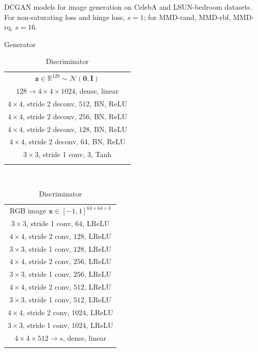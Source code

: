 \documentclass{article} %
\theoremstyle{plain}
\newtheorem*{proposition 1*}{Proposition 1}
\newcommand{\ds}[1]{\mathcal{#1}}  %
\newcommand{\set}[1]{\mathbb{#1}}  %
\def\toprule{\noalign{\smallskip\hrule height 1.2pt\smallskip}}
\def\midrule{\noalign{\smallskip\hrule\smallskip}}
\let\bottomrule=\toprule
\begin{document}
\begin{appendices}
\begin{table}[hbt]
	\centering
	\caption{DCGAN models for image generation on CelebA and LSUN-bedroom datasets. For non-saturating loss and hinge loss, \(s=1\); for MMD-rand, MMD-rbf, MMD-rq, \(s=16\).}
	\label{Tab:architecture2}
	\begin{subtable}{0.45\textwidth}
		\centering
		\caption{Generator}
		\begin{tabular}{c}
			\toprule
			\(\bm{z}\in\set{R}^{128}\sim\ds{N}(\bm{0},\bm{I})\) \\
			\midrule
			\(128\to 4\times 4\times1024\), dense, linear \\
			\midrule
			\(4\times4\), stride 2 deconv, \(512\), BN, ReLU\\
			\midrule
			\(4\times4\), stride 2 deconv, \(256\), BN, ReLU\\
			\midrule
			\(4\times4\), stride 2 deconv, \(128\), BN, ReLU\\
			\midrule
			\(4\times4\), stride 2 deconv, \(64\), BN, ReLU\\
			\midrule
			\(3\times3\), stride 1 conv, \(3\), Tanh\\
			\bottomrule
		\end{tabular}
	\end{subtable}
	~
	\begin{subtable}{0.45\textwidth}
		\centering
		\caption{Discriminator}
		\begin{tabular}{c}
			\toprule
			RGB image \(\bm{x}\in[-1,1]^{64\times 64\times3}\) \\
			\midrule
			\(3\times3\), stride 1 conv, \(64\), LReLU\\
			\midrule
			\(4\times4\), stride 2 conv, \(128\), LReLU\\
			\(3\times3\), stride 1 conv, \(128\), LReLU\\
			\midrule
			\(4\times4\), stride 2 conv, \(256\), LReLU\\
			\(3\times3\), stride 1 conv, \(256\), LReLU\\
			\midrule
			\(4\times4\), stride 2 conv, \(512\), LReLU\\
			\(3\times3\), stride 1 conv, \(512\), LReLU\\
			\midrule
			\(4\times4\), stride 2 conv, \(1024\), LReLU\\
			\(3\times3\), stride 1 conv, \(1024\), LReLU\\
			\midrule
			\(4\times 4\times512\to s\), dense, linear\\
			\bottomrule
		\end{tabular}
	\end{subtable}
\end{table}


\end{appendices}
\end{document}
